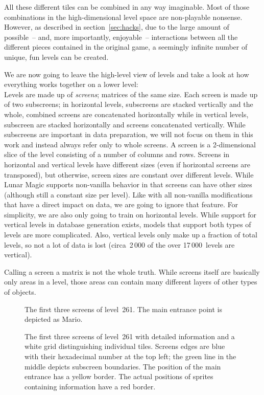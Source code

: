 All these different tiles can be combined in any way imaginable. Most
of those combinations in the high-dimensional level space are
non-playable nonsense. However, as described in
section~\ref{sec:hacks}, due to the large amount of possible~-- and,
more importantly, enjoyable~-- interactions between all the different
pieces contained in the original game, a seemingly infinite number of
unique, fun levels can be created.
\medskip

We are now going to leave the high-level view of levels and take a
look at how everything works together on a lower level: \\
Levels are made up of \emph{screens}; matrices of the same size. Each
screen is made up of two subscreens; in horizontal levels, subscreens
are stacked vertically and the whole, combined screens are
concatenated horizontally while in vertical levels, subscreen are
stacked horizontally and screens concatenated vertically. While
subscreens are important in data preparation, we will not focus on
them in this work and instead always refer only to whole screens. A
screen is a 2-dimensional slice of the level consisting of a number of
columns and rows. Screens in horizontal and vertical levels have
different sizes (even if horizontal screens are transposed), but
otherwise, screen sizes are constant over different levels. While
Lunar Magic supports non-vanilla behavior in that screens can have
other sizes (although still a constant size per level). Like with all
non-vanilla modifications that have a direct impact on data, we are
going to ignore that feature. For simplicity, we are also only going
to train on horizontal levels. While support for vertical levels in
database generation exists, models that support both types of levels
are more complicated. Also, vertical levels only make up a fraction of
total levels, so not a lot of data is lost (circa~2\,000 of the over
17\,000~levels are vertical).

Calling a screen a matrix is not the whole truth. While screens itself
are basically only areas in a level, those areas can contain many
different layers of other types of objects.

\begin{figure}[t]
  \centering
  \caption{The first three screens of level~261. The main entrance
    point is depicted as Mario.}
  \label{fig:105-clean}
\end{figure}

\begin{figure}[t]
  \centering
  \caption{The first three screens of level~261 with detailed
    information and a white grid distinguishing individual tiles.
    Screens edges are blue with their hexadecimal number at the top
    left; the green line in the middle depicts subscreen boundaries.
    The position of the main entrance has a yellow border. The actual
    positions of sprites containing information have a red border.}
  \label{fig:105-detailed}
\end{figure}

